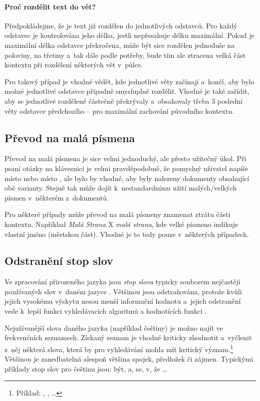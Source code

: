 \paragraph{Proč rozdělit text do vět?}
Předpokládejme, že je text již rozdělen do jednotlivých odstavců. Pro každý odstavec je kontrolována jeho délka, jestli nepřesahuje délku maximální. Pokud je maximální délka odstavce překročena, může být sice rozdělen jednoduše na poloviny, na třetiny a~tak dále podle potřeby, bude tím ale ztracena velká část kontextu při rozdělení některých vět v~půlce.\par
Pro takový případ je vhodné vědět, kde jednotlivé věty začínají a~končí, aby bylo možné jednotlivé odstavce případně smysluplně rozdělit. Vhodné je také zařídit, aby se jednotlivé rozdělené  částečně překrývaly a~obsahovaly třeba 3 poslední věty odstavce předchozího -- pro maximální zachování původního kontextu.

\subsection{Převod na malá písmena}
\label{prevod_na_mala}
Převod na malá písmena je sice velmi jednoduchý, ale přesto užitečný úkol. Při psaní otázky na klávesnici je velmi pravděpodobně, že pomyslný uživatel napíše  místo  nebo  místo , ale bylo by vhodné, aby byly nalezeny dokumenty obsahující obě varianty. Stejně tak může dojít k~nestandardnímu užití malých/velkých písmen v~některém z~dokumentů.\par
Pro některé případy může převod na malá písmeny znamenat ztrátu části kontextu. Například \emph{Malá Strana} X \emph{malá strana}, kde velké písmeno indikuje vlastní jméno (městskou část). Vhodné je to tedy pouze v~některých případech.

\subsection{Odstranění stop slov}
\label{stopwords}
Ve zpracování přirozeného jazyka jsou \emph{stop slova} typicky souborem nejčastěji používaných slov v~daném jazyce \cite{information_retrieval}. Většinou jsou odstraňována, protože kvůli jejich vysokému výskytu nesou menší informační hodnotu a~jejich odstranění vede k~lepší funkci vyhledávacích algoritmů a hodnotících funkcí \cite{bm25_improvements}.\par
Nejužívanější slova daného jazyka (například češtiny) je možno najít ve frekvenčních seznamech. Získaný seznam je vhodné kriticky zhodnotit a~vyčlenit z~něj některá slova, která by pro vyhledávání mohla mít kritický význam.\footnote{Příklad: , ,  \dots} Většinou je zanedbatelná alespoň většina spojek, předložek či zájmen. Typickými příklady stop slov pro češtinu jsou: být, a, se, v, že \dots

